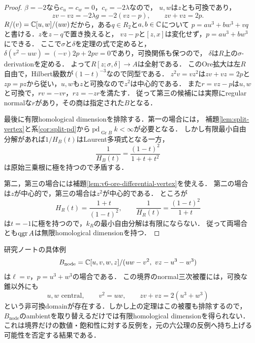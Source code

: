 \documentclass[11pt,a4paper]{ltjsarticle}
\begin{document}
\begin{proof}
$\beta=-2$なら$c_u=c_w=0$，$c_v=-2\lambda$なので，
$u,w$は$z$とも可換であり，
\[
 zv-vz=-2\lambda g=-2(vz-p),\qquad zv+vz=2p.
\]
$R/(v)=\mathbb C[u,w]/(uw)$だから，ある$q\in R_2$と$a,b\in\mathbb C$について
$p=a u^3+b w^3+vq$と書ける．$z$を$z-q$で置き換えると，
$vz-p$と$[z,x]$は変化せず，$p=a u^3+b w^3$にできる．
ここで$\sigma$と$\delta$を定理の式で定めると，
$\delta(v^2-uw)=(-v)2p+2pv=0$であり，可換関係も保つので，
$\delta$は$R$上の$\sigma$-derivationを定める．
よって$R[z;\sigma,\delta]\to A$は全射である．
このOre拡大は左$R$自由で，Hilbert級数が$(1-t)^{-3}$なので同型である．
$z^2v=vz^2$は$zv+vz=2p$と$zp=pz$から従い，$u,w$も$z$と可換なので$z^2$は中心的である．
また$r=vz-p$は$u,w$と可換で，$rv=-vr$，$rz=-zr$を満たす．
従って第三の候補には実際にregular normalな$r$があり，その商は指定された$B$となる．

最後に有限homological dimensionを排除する．第一の場合には，
補題\ref{lem:split-vertex}と系\ref{cor:split-pd}から$\operatorname{pd}_{\operatorname{Gr}B}k<\infty$が必要となる．
しかし有限最小自由分解があれば$1/H_B(t)$はLaurent多項式となる一方，
\[
 \frac1{H_B(t)}=\frac{(1-t)^2}{1+t+t^2}
\]
は原始三乗根に極を持つので矛盾する．

第二，第三の場合には補題\ref{lem:v6-ore-differential-vertex}を使える．
第二の場合は$z$が中心的で，第三の場合は$z^2$が中心的である．
ところが
\[
 H_R(t)=\frac{1+t}{(1-t)^2},\qquad
 \frac1{H_R(t)}=\frac{(1-t)^2}{1+t}
\]
は$t=-1$に極を持つので，$k_R$の最小自由分解は有限にならない．
従って両場合とも$\operatorname{qgr} A$は無限homological dimensionを持つ．
\end{proof}

\begin{remark}[節点境界の場合]
研究ノートの具体例
\[
 B_{\mathrm{node}}=
 \mathbb C[u,v,w,z]/(uw-v^2,\ vz-u^3-w^3)
\]
は$\ell=v$，$p=u^3+w^3$の場合である．
この境界のnormal三次被覆には，可換な錐以外にも
\[
 u,w\text{ central},\qquad v^2=uw,
 \qquad zv+vz=2(u^3+w^3)
\]
という非可換domainが存在する．しかし上の定理はこの被覆も排除するので，
$B_{\mathrm{node}}$のambientを取り替えるだけでは有限homological dimensionを得られない．
これは境界だけの数値・飽和性に対する反例を，元の六公理の反例へ持ち上げる可能性を否定する結果である．
\end{remark}
\end{document}
